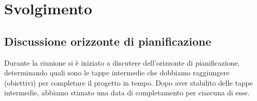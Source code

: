 \section{Svolgimento}

\subsection{Discussione orizzonte di pianificazione}
Durante la riunione si è iniziato a discutere dell'orizzonte di pianificazione, determinando quali sono le tappe intermedie che dobbiamo raggiungere (obiettivi) per completare il progetto in tempo. Dopo aver stabilito delle tappe intermedie, abbiamo stimato una data di completamento per ciascuna di esse.